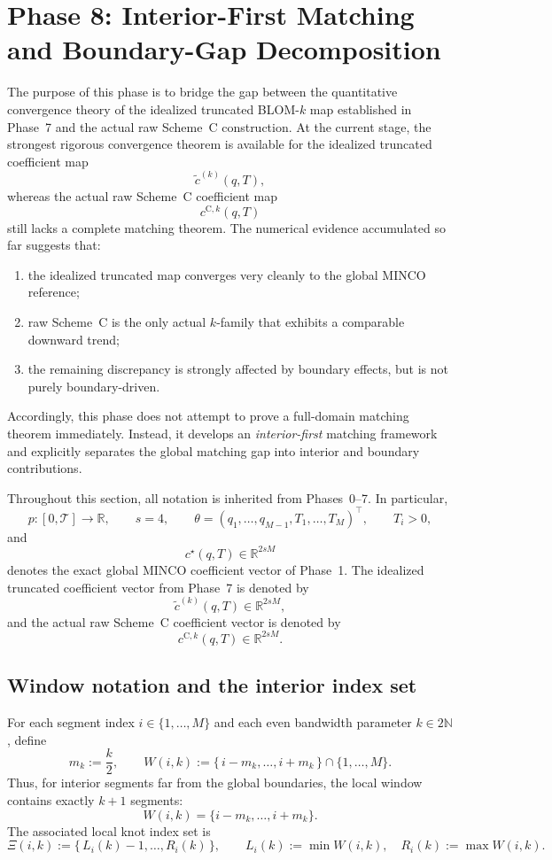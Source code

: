 \section{Phase 8: Interior-First Matching and Boundary-Gap Decomposition}
\label{sec:phase8_interior_matching}

The purpose of this phase is to bridge the gap between the quantitative convergence theory of the idealized truncated BLOM-\(k\) map established in Phase~7 and the actual raw Scheme~C construction.
At the current stage, the strongest rigorous convergence theorem is available for the idealized truncated coefficient map
\[
\tilde c^{(k)}(q,T),
\]
whereas the actual raw Scheme~C coefficient map
\[
c^{\mathrm{C},k}(q,T)
\]
still lacks a complete matching theorem.
The numerical evidence accumulated so far suggests that:
\begin{enumerate}
    \item the idealized truncated map converges very cleanly to the global MINCO reference;
    \item raw Scheme~C is the only actual \(k\)-family that exhibits a comparable downward trend;
    \item the remaining discrepancy is strongly affected by boundary effects, but is not purely boundary-driven.
\end{enumerate}
Accordingly, this phase does not attempt to prove a full-domain matching theorem immediately.
Instead, it develops an \emph{interior-first} matching framework and explicitly separates the global matching gap into interior and boundary contributions.

Throughout this section, all notation is inherited from Phases~0--7.
In particular,
\[
p:[0,\mathcal T]\to\mathbb R,\qquad
s=4,\qquad
\theta=(q_1,\dots,q_{M-1},T_1,\dots,T_M)^\top,
\qquad
T_i>0,
\]
and
\[
c^\star(q,T)\in\mathbb R^{2sM}
\]
denotes the exact global MINCO coefficient vector of Phase~1.
The idealized truncated coefficient vector from Phase~7 is denoted by
\[
\tilde c^{(k)}(q,T)\in\mathbb R^{2sM},
\]
and the actual raw Scheme~C coefficient vector is denoted by
\[
c^{\mathrm{C},k}(q,T)\in\mathbb R^{2sM}.
\]

\subsection{Window notation and the interior index set}
\label{subsec:phase8_interior_index}

For each segment index \(i\in\{1,\dots,M\}\) and each even bandwidth parameter \(k\in 2\mathbb N\), define
\[
m_k:=\frac{k}{2},
\qquad
W(i,k):=\{\,i-m_k,\dots,i+m_k\,\}\cap\{1,\dots,M\}.
\]
Thus, for interior segments far from the global boundaries, the local window contains exactly \(k+1\) segments:
\[
W(i,k)=\{i-m_k,\dots,i+m_k\}.
\]
The associated local knot index set is
\[
\Xi(i,k):=\{\,L_i(k)-1,\dots,R_i(k)\,\},
\qquad
L_i(k):=\min W(i,k),\quad R_i(k):=\max W(i,k).
\]

